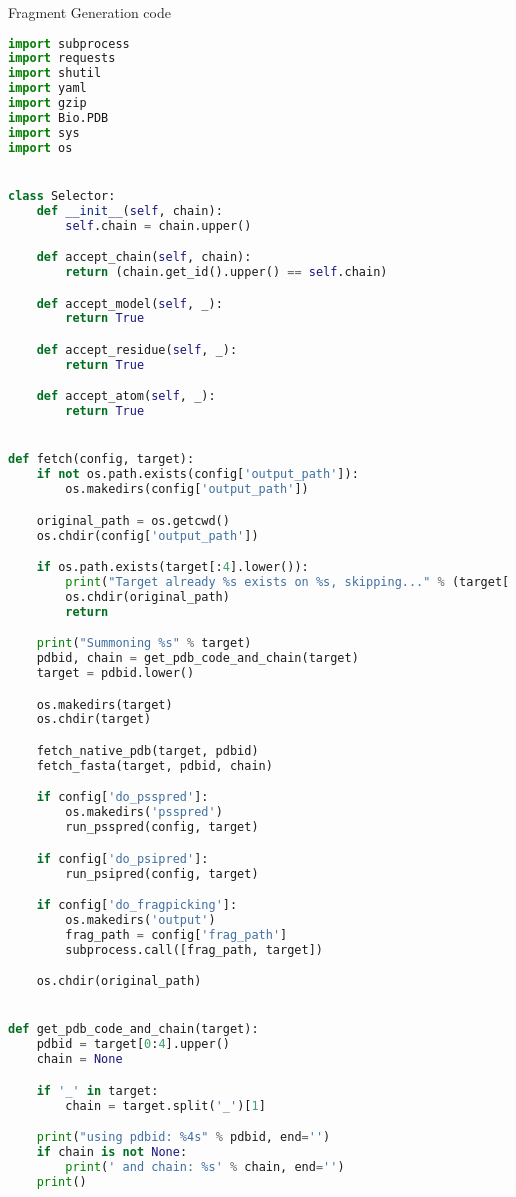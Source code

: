 \begin{section}{Fragment Generation code}\label{sec:frag-gen}
\begin{lstlisting}[language=Python]
import subprocess
import requests
import shutil
import yaml
import gzip
import Bio.PDB
import sys
import os


class Selector:
    def __init__(self, chain):
        self.chain = chain.upper()

    def accept_chain(self, chain):
        return (chain.get_id().upper() == self.chain)

    def accept_model(self, _):
        return True

    def accept_residue(self, _):
        return True

    def accept_atom(self, _):
        return True


def fetch(config, target):
    if not os.path.exists(config['output_path']):
        os.makedirs(config['output_path'])

    original_path = os.getcwd()
    os.chdir(config['output_path'])

    if os.path.exists(target[:4].lower()):
        print("Target already %s exists on %s, skipping..." % (target[:4].lower(), config['output_path']))
        os.chdir(original_path)
        return

    print("Summoning %s" % target)
    pdbid, chain = get_pdb_code_and_chain(target)
    target = pdbid.lower()

    os.makedirs(target)
    os.chdir(target)

    fetch_native_pdb(target, pdbid)
    fetch_fasta(target, pdbid, chain)

    if config['do_psspred']:
        os.makedirs('psspred')
        run_psspred(config, target)

    if config['do_psipred']:
        run_psipred(config, target)

    if config['do_fragpicking']:
        os.makedirs('output')
        frag_path = config['frag_path']
        subprocess.call([frag_path, target])

    os.chdir(original_path)


def get_pdb_code_and_chain(target):
    pdbid = target[0:4].upper()
    chain = None

    if '_' in target:
        chain = target.split('_')[1]

    print("using pdbid: %4s" % pdbid, end='')
    if chain is not None:
        print(' and chain: %s' % chain, end='')
    print()


\end{lstlisting}
\end{section}
